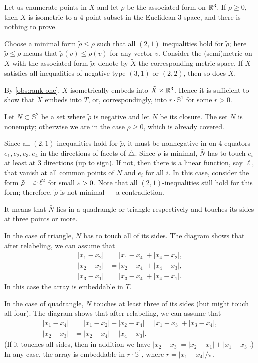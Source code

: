 \documentclass[a4paper,10pt]{article}
\begin{document}
Let us enumerate points in $X$ and let $\rho$ be the associated form on $\mathbb{R}^3$.
If $\rho\ge 0$, then $X$ is isometric to a 4-point subset in the Euclidean 3-space,
and there is nothing to prove.

Choose a minimal form $\tilde\rho\le \rho$ such that all $(2,1)$ inequalities hold for $\tilde\rho$;
here $\tilde\rho\le \rho$ means that $\tilde\rho(v)\le \rho(v)$ for any vector $v$.
Consider the (semi)metric on $X$ with the associated form $\tilde\rho$; denote by
$\tilde X$ the corresponding metric space.
If $X$ satisfies all inequalities of negative type $(3, 1)$ or $(2,2)$, then so does $\tilde X$.

By \ref{obs:rank-one}, $X$ isometrically embeds into $\tilde X\times \mathbb{R}^3$.
Hence it is sufficient to show that $\tilde X$ embeds into $T$, or, correspondingly, into $r\cdot \mathbb{S}^1$ for some $r>0$.

Let $N\subset \mathbb{S}^2$ be a set where $\tilde\rho$ is negative and let $\bar N$ be its closure.
The set $N$ is nonempty; otherwise we are in the case $\rho\ge 0$, which is already covered.

Since all $(2,1)$-inequalities hold for $\tilde\rho$,
it must be nonnegative in on 4 equators $e_1,e_2,e_3,e_4$ in the directions of facets of $\triangle$.
Since $\tilde\rho$ is minimal, $\bar N$ has to touch $e_i$ at least at 3 directions (up to sign). 
If not, then there is a linear function, say $\ell$, that vanish at all common points of $\bar N$ and $e_i$ for all $i$.
In this case, consider the form $\tilde\rho-\eps\cdot \ell^2$ for small $\varepsilon>0$.
Note that all $(2,1)$-inequalities still hold for this form;
therefore, $\tilde\rho$ is not minimal --- a contradiction.

It means that $\bar N$ lies in a quadrangle or triangle respectively and touches its sides at three points or more.

In the case of triangle, $\bar N$ has to touch all of its sides.
The diagram shows that after relabeling, we can assume that 
\begin{align*}
|x_1-x_2|&=|x_1-x_4|+|x_4-x_2|,
\\
|x_2-x_3|&=|x_2-x_4|+|x_4-x_3|,
\\
|x_3-x_1|&=|x_3-x_4|+|x_4-x_1|.
\end{align*}
In this case the array is embeddable in $T$.

In the case of quadrangle, $\bar N$ touches at least three of its sides (but might touch all four).
The diagram shows that after relabeling, we can assume that 
\begin{align*}
|x_1-x_4|&=|x_1-x_2|+|x_2-x_4|=|x_1-x_3|+|x_3-x_4|,
\\
|x_2-x_3|&=|x_2-x_4|+|x_4-x_3|.
\end{align*}
(If it touches all sides, then in addition we have $|x_2-x_3|=|x_2-x_1|+|x_1-x_3|$.)
In any case, the array is embeddable in $r\cdot \mathbb{S}^1$, where $r=|x_1-x_4|/\pi$.
\qeds
\end{document}
